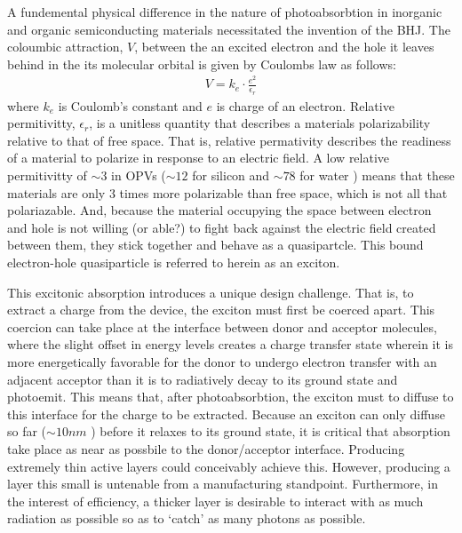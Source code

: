 A fundemental physical difference in the nature of photoabsorbtion in inorganic and organic 
semiconducting materials necessitated the
invention of the BHJ. The coloumbic attraction, $V$, between the an excited
electron and the hole it leaves behind in the its molecular orbital
is given by Coulombs law as follows:
\begin{align}
    \label{coulomb}
    V  =  k_{e} \cdot \frac{e^{2}}{\epsilon_{r}}
\end{align}
where $k_{e}$ is Coulomb's constant and $e$ is charge of an electron. Relative permitivitty,
$\epsilon_{r}$, is a unitless quantity that describes a materials polarizability relative
to that of free space. That is, relative
permativity describes the readiness of a material
to polarize in response to an electric field. A low
relative permitivitty of ${\sim}3$ in OPVs (${\sim}12$ for silicon \cite{Baroni1986} and ${\sim}78$ for water \cite{George2004})
means that these materials are only $3$ times more polarizable than free space, which
is not all that polariazable. And, because the material occupying the space between electron and hole
is not willing (or able?) to fight back against the electric field created between them, they stick together and behave as a quasipartcle. 
This bound electron-hole quasiparticle is referred to herein as an exciton.

This excitonic absorption introduces a unique design challenge.
That is, to extract a charge from the device, the exciton
must first be coerced apart. This coercion can take place at the interface between donor and acceptor molecules,
where the slight offset in energy levels creates a charge transfer state wherein it is more
energetically favorable for the donor to undergo electron transfer with an adjacent acceptor than
it is to radiatively decay to its ground state and photoemit.
This means that, after photoabsorbtion, the exciton must to diffuse to this interface for the charge to be
extracted. Because an exciton can only diffuse so far (${\sim}10nm$ \cite{clarke2010}) before it relaxes to
its ground state, it is critical that absorption take place as near as possbile to the donor/acceptor
interface. 
Producing extremely thin active layers could conceivably achieve this. However,
producing a layer this small is untenable from a manufacturing standpoint. Furthermore, in the interest of
efficiency, a thicker layer
is desirable to interact with as much radiation as possible so as to `catch' as many photons
as possible. 

